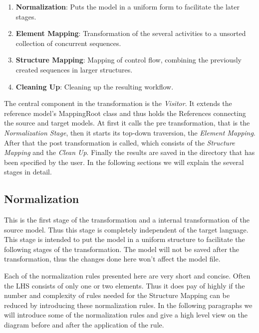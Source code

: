 \begin{enumerate}
	\item \textbf{Normalization}: Puts the model in a uniform form to facilitate the later stages.
	\item \textbf{Element Mapping}: Transformation of the several activities to a unsorted collection of concurrent sequences.
	\item \textbf{Structure Mapping}: Mapping of control flow, combining the previously created sequences in larger structures.
	\item \textbf{Cleaning Up}: Cleaning up the resulting workflow.
\end{enumerate}

The central component in the transformation is the \emph{Visitor}. It extends the reference model's MappingRoot class and thus holds the References connecting the source and target models. At first it calls the pre transformation, that is the \emph{Normalization Stage}, then it starts its top-down traversion, the \emph{Element Mapping}. After that the post transformation is called, which consists of the \emph{Structure Mapping} and the \emph{Clean Up}. Finally the results are saved in the directory that has been specified by the user. In the following sections we will explain the several stages in detail.


\subsection{Normalization}

This is the first stage of the transformation and a internal transformation of the source model. Thus this stage is completely independent of the target language. This stage is intended to put the model in a uniform structure to facilitate the following stages of the transformation. The model will not be saved after the transformation, thus the changes done here won't affect the model file.

Each of the normalization rules presented here are very short and concise. Often the LHS consists of only one or two elements. Thus it does pay of highly if the number and complexity of rules needed for the Structure Mapping can be reduced by introducing these normalization rules. In the following paragraphs we will introduce some of the normalization rules and give a high level view on the diagram before and after the application of the rule.

